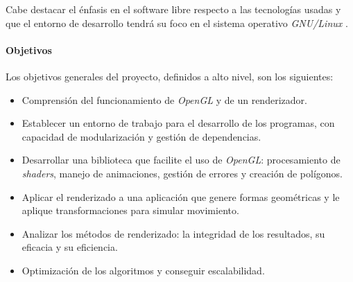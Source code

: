 Cabe destacar el énfasis en el software libre respecto a las tecnologías usadas y que el entorno de desarrollo tendrá su foco en el sistema operativo \textit{GNU/Linux} \cite{webGNULinux}.

\paragraph{Objetivos} Los objetivos generales del proyecto, definidos a alto nivel, son los siguientes:

\begin{itemize}

    \item Comprensión del funcionamiento de \textit{OpenGL} y de un renderizador.
    \item Establecer un entorno de trabajo para el desarrollo de los programas, con capacidad de modularización y gestión de dependencias.
    
    \item Desarrollar una biblioteca que facilite el uso de \textit{OpenGL}: procesamiento de \textit{shaders}, manejo de animaciones, gestión de errores y creación de polígonos.
    
    \item Aplicar el renderizado a una aplicación que genere formas geométricas y le aplique transformaciones para simular movimiento.
    
    \item Analizar los métodos de renderizado: la integridad de los resultados, su eficacia y su eficiencia.
    
    \item Optimización de los algoritmos y conseguir escalabilidad.
    
\end{itemize}


